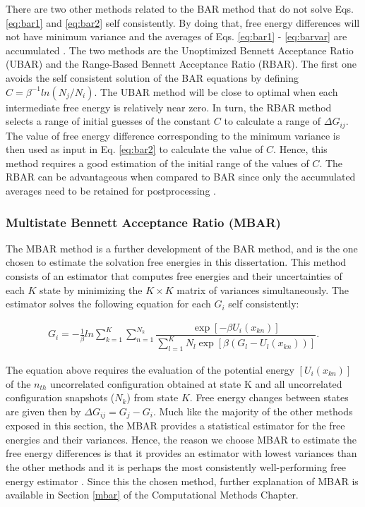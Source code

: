 There are two other methods related to the BAR method that do not solve Eqs. \eqref{eq:bar1} and \eqref{eq:bar2} self consistently. By doing that, free energy differences will not have minimum variance and the averages of Eqs. \eqref{eq:bar1} - \eqref{eq:barvar} are accumulated \cite{bareva}. The two methods are the Unoptimized Bennett Acceptance Ratio (UBAR) and the Range-Based Bennett Acceptance Ratio (RBAR). The first one avoids the self consistent solution of the BAR equations by defining $C=\beta^{-1}ln(N_{j}/N_{i})$. The UBAR method will be close to optimal when each intermediate free energy is relatively near zero. In turn, the RBAR method selects a range of initial guesses of the constant $C$ to calculate a range of $\Delta G_{ij}$. The value of free energy difference corresponding to the minimum variance is then used as input in Eq. \eqref{eq:bar2} to calculate the value of $C$. Hence, this method requires a good estimation of the initial range of the values of $C$. The RBAR can be advantageous when compared to BAR since only the accumulated averages need to be retained for postprocessing \cite{bareva}.  

\subsubsection{Multistate Bennett Acceptance Ratio (MBAR)}

The MBAR method \cite{mbar} is a further development of the BAR method, and is the one chosen to estimate the solvation free energies in this dissertation. This method consists of an estimator that computes free energies and their uncertainties of each $K$ state by minimizing the $K \times K$ matrix of variances simultaneously. The estimator solves the following equation for each $G_{i}$ self consistently:


\begin{equation}
\label{eq:mbar}
\begin{aligned}
G_{i} = - \frac{1}{\beta}ln \sum_{k=1}^{K} \sum_{n=1}^{N_{k}}
\dfrac{\exp[-\beta U_{i}(x_{kn})]}{\sum_{l=1}^{K} N_{l} \exp[\beta (G_{l} - U_{l}(x_{kn}))]} .
\end{aligned}
\end{equation}

The equation above requires the evaluation of the potential energy $[U_{i}(x_{kn})]$ of  the $n_{th}$ uncorrelated configuration obtained at state K and  all uncorrelated configuration snapshots ($N_{k}$) from state $K$. Free energy changes between states are given then by $\Delta G_{ij} = G_{j} -  G_{i}$. Much like the majority of the other methods exposed in this section, the MBAR provides a statistical estimator for the free energies and their variances. Hence, the reason we choose MBAR to estimate the free energy differences is that it provides an estimator with lowest variances than the other methods and it is perhaps the most consistently well-performing free
energy estimator \cite{bareva}. Since this the chosen method, further explanation of MBAR is available in Section \ref{mbar} of the Computational Methods Chapter.
